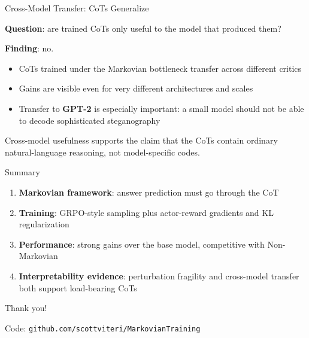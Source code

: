 \documentclass[aspectratio=169]{beamer}
\begin{document}
\begin{frame}{Cross-Model Transfer: CoTs Generalize}

\textbf{Question}: are trained CoTs only useful to the model that produced them?

\bigskip
\textbf{Finding}: no.

\begin{itemize}
    \item CoTs trained under the Markovian bottleneck transfer across different critics
    \item Gains are visible even for very different architectures and scales
    \item Transfer to \textbf{GPT-2} is especially important: a small model should not be able to decode sophisticated steganography
\end{itemize}

\bigskip
\begin{center}
\colorbox{mkgreen!10}{\parbox{0.82\textwidth}{\centering
Cross-model usefulness supports the claim that the CoTs contain ordinary natural-language reasoning, not model-specific codes.
}}
\end{center}
\end{frame}

\begin{frame}{Summary}

\begin{enumerate}
    \item \textbf{Markovian framework}: answer prediction must go through the CoT
    \item \textbf{Training}: GRPO-style sampling plus actor-reward gradients and KL regularization
    \item \textbf{Performance}: strong gains over the base model, competitive with Non-Markovian
    \item \textbf{Interpretability evidence}: perturbation fragility and cross-model transfer both support load-bearing CoTs
\end{enumerate}

\vspace{0.3cm}
\begin{center}
\Large Thank you!

\normalsize
Code: \texttt{github.com/scottviteri/MarkovianTraining}
\end{center}
\end{frame}
\end{document}
